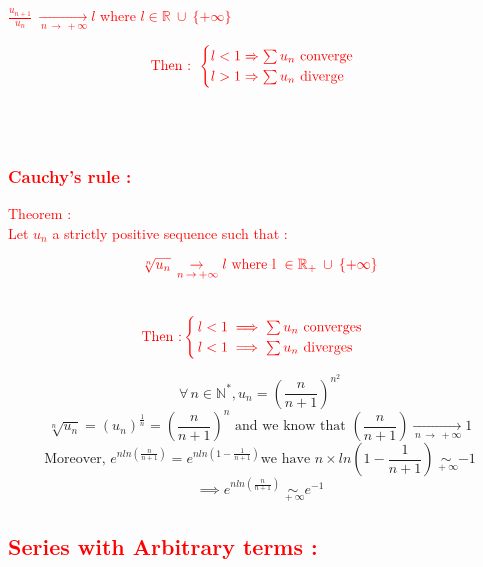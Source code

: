 \documentclass[a4paper,12pt]{article}
\begin{document}
\textcolor{red}{$\frac{u_{n+1}}{u_n} \: \underset{\,n \,\to \,+\infty}{\to} l$ where $l \in \mathbb{R} \:\cup \: \{ +\infty\}$}

\[
\textcolor{red}{ \text{Then : }
\begin{cases}
    l < 1 \Rightarrow \sum u_n \text{ converge} \\
    l > 1 \Rightarrow \sum u_n \text{ diverge}
\end{cases}
}
\]

\\

\\
\bigskip

\textcolor{red}{\subsubsection*{Cauchy's rule :}}
\bigskip

\textcolor{red}{Theorem :}\\

\textcolor{red}{Let $u_n$ a strictly positive sequence such that :}

\[
\textcolor{red}{\sqrt[n]{u_n} \underset{\, n\, \to \, +\infty}{\to} l \text{ where l } \in \mathbb{R_+} \: \cup \:\{+\infty\}}
\] \\
\[
\textcolor{red}{\text{Then :} \begin{cases}
    \,l < 1 \implies \sum{u_n} \text{ converges}\\
    \, l< 1\implies \sum{u_n} \text{ diverges}
\end{cases}}
\]

\[
\forall \, n\in\mathbb{N}^*, u_n = (\frac{n}{n+1})^{n^2} 
\]
\[
\sqrt[n]{u_n} = (u_n)^\frac{1}{n} = (\frac{n}{n+1})^n 
\text{ and we know that } (\frac{n}{n+1}) \underset{\, n\, \to \, +\infty}{\to} 1
\]
\[
\text{Moreover, } e^{nln(\frac{n}{n+1})} = e^{nln(1-\frac{1}{n+1})} 
\text{we have } n\times ln(1 - \frac{1}{n+1}) \underset{\,+\infty}{\sim} {-1} 
\]
\[
\implies e^{nln(\frac{n}{n+1})} \underset{\,+\infty}{\sim} {e^{-1}} 
\]

\newpage

\textcolor{red}{\subsection*{Series with Arbitrary terms :}}\bigskip
\end{document}
